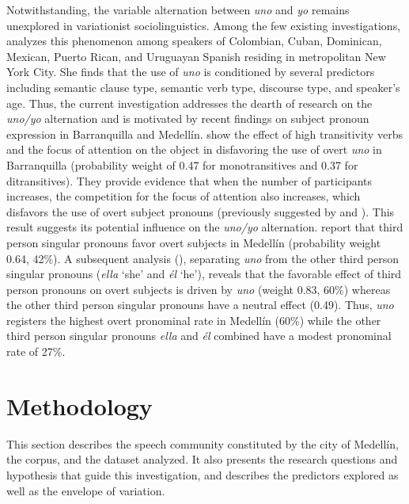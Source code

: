 \documentclass[output=paper]{langscibook}
\begin{document}
Notwithstanding, the variable alternation between \textit{uno} and \textit{yo} remains unexplored in variationist sociolinguistics. Among the few existing investigations, \citet{Flores-Ferrán2009} analyzes this phenomenon among speakers of Colombian, Cuban, Dominican, Mexican, Puerto Rican, and Uruguayan Spanish residing in metropolitan New York City. She finds that the use of \textit{uno} is conditioned by several predictors including semantic clause type, semantic verb type, discourse type, and speaker’s age. Thus, the current investigation addresses the dearth of research on the \textit{uno/yo} alternation and is motivated by recent findings on subject pronoun expression in Barranquilla and Medellín. \citet{HurtadoOrtega-Santos2019} show the effect of high transitivity verbs and the focus of attention on the object in disfavoring the use of overt \textit{uno} in Barranquilla (probability weight of 0.47 for monotransitives and 0.37 for ditransitives). They provide evidence that when the number of participants increases, the competition for the focus of attention also increases, which disfavors the use of overt subject pronouns (previously suggested by \citealt{AijónOlivaSerrano2013} and \citealt{Posio2011}). This result suggests its potential influence on the \textit{uno/yo} alternation.  \citet[14]{OrozcoHurtado2021} report that third person singular pronouns favor overt subjects in Medellín (probability weight 0.64, 42\%). A subsequent analysis (\citealt{HurtadoOrozco2022}), separating \textit{uno} from the other third person singular pronouns (\textit{ella} ‘she’ and \textit{él} ‘he’), reveals that the favorable effect of third person pronouns on overt subjects is driven by \textit{uno} (weight 0.83, 60\%) whereas the other third person singular pronouns have a neutral effect (0.49). Thus, \textit{uno} registers the highest overt pronominal rate in Medellín (60\%) while the other third person singular pronouns \textit{ella} and \textit{él} combined have a modest pronominal rate of 27\%.  



\section{Methodology\label{sec:orozco:3}}


This section describes the speech community constituted by the city of Medellín, the corpus, and the dataset analyzed. It also presents the research questions and hypothesis that guide this investigation, and describes the predictors explored as well as the envelope of variation. 
\end{document}
